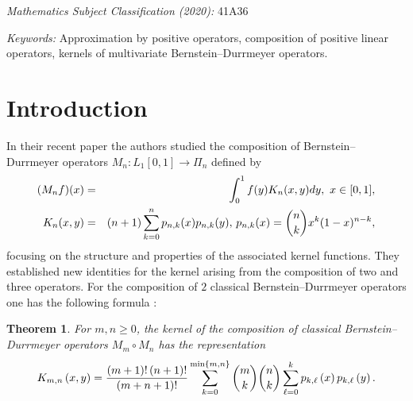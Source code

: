 \documentclass[12pt,reqno]{article}
\newtheorem{theorem}{Theorem}
\begin{document}
\vspace{2cm}

\newpage

\begin{abstract}
This paper presents a representation for the kernel of the composition of
multivariate Bernstein--Durrmeyer operators for functions defined on the
standard simplex in $\mathbb{R}^{d}$.
\end{abstract}

\bigskip

\bigskip

\smallskip \emph{Mathematics Subject Classification (2020):} 41A36 

\smallskip \emph{Keywords:} Approximation by positive operators, composition
of positive linear operators, kernels of multivariate Bernstein--Durrmeyer
operators.


\vspace{2cm}

\section{Introduction}

\label{intro}

In their recent paper \cite{AAHR-Kernels for composition-JMAA-2026} the
authors studied the composition of Bernstein--Durrmeyer operators $%
M_{n}:L_{1}[0,1]\longrightarrow \Pi _{n}$ defined by 
\begin{eqnarray*}
(M_{n}f)(x) &=&\int_{0}^{1}f(y)K_{n}(x,y)dy,\,\,x\in \lbrack 0,1], \\
K_{n}(x,y) &=&(n+1)\sum_{k=0}^{n}p_{n,k}(x)p_{n,k}(y),\,p_{n,k}(x)=\binom{n}{%
k}x^{k}(1-x)^{n-k},
\end{eqnarray*}%
focusing on the structure and properties of the associated kernel functions.
They established new identities for the kernel arising from the composition
of two and three operators. For the composition of $2$ classical
Bernstein--Durrmeyer operators one has the following formula \cite[Theorem~1]%
{AAHR-Kernels for composition-JMAA-2026}:\ 

\begin{theorem}
\label{theorem-beautyful-representation-r=2}For $m,n\geq 0$, the kernel of
the composition of classical Bernstein--Durrmeyer operators $M_{m}\circ
M_{n} $ has the representation 
\begin{equation*}
K_{m,n}\left( x,y\right) =\frac{\left( m+1\right) !\left( n+1\right) !}{%
\left( m+n+1\right) !}\sum_{k=0}^{\min \{m,n\}}\binom{m}{k}\binom{n}{k}%
\sum_{\ell =0}^{k}p_{k,\ell }\left( x\right) p_{k,\ell }\left( y\right) .
\end{equation*}
\end{theorem}
\end{document}
